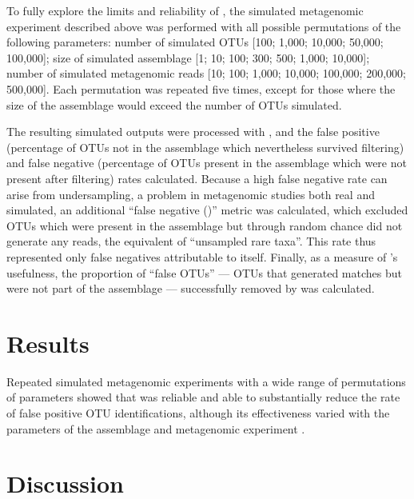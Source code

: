 To fully explore the limits and reliability of , the simulated metagenomic experiment described above was performed with all possible permutations of the following parameters: number of simulated \acp{OTU} [100; 1,000; 10,000; 50,000; 100,000]; size of simulated assemblage [1; 10; 100; 300; 500; 1,000; 10,000]; number of simulated metagenomic reads [10; 100; 1,000; 10,000; 100,000; 200,000; 500,000].
Each permutation was repeated five times, except for those where the size of the assemblage would exceed the number of \acp{OTU} simulated.

The resulting simulated  outputs were processed with , and the false positive (percentage of \acp{OTU} not in the assemblage which nevertheless survived  filtering) and false negative (percentage of \acp{OTU} present in the assemblage which were not present after  filtering) rates calculated.
Because a high false negative rate can arise from undersampling, a problem in metagenomic studies both real and simulated, an additional ``false negative ()'' metric was calculated, which excluded \acp{OTU} which were present in the assemblage but through random chance did not generate any reads, the equivalent of ``unsampled rare taxa''.
This rate thus represented only false negatives attributable to  itself.
Finally, as a measure of 's usefulness, the proportion of ``false \acp{OTU}'' --- \acp{OTU} that generated  matches but were not part of the assemblage --- successfully removed by  was calculated.

\section{Results}

Repeated simulated metagenomic experiments with a wide range of permutations of parameters showed that  was reliable and able to substantially reduce the rate of false positive \ac{OTU} identifications, although its effectiveness varied with the parameters of the assemblage and metagenomic experiment .



\section{Discussion}

